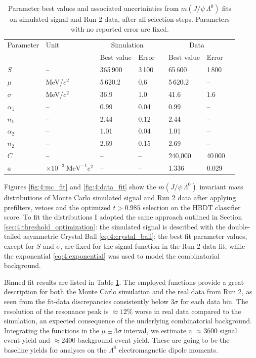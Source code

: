 \begin{table}
	\begin{center}
	\begin{tabular}{@{}llllllll@{}}
		\toprule
		Parameter
		& Unit
		& \multicolumn{2}{c}{Simulation}	& \phantom{a}
		& \multicolumn{2}{c}{Data} \\
		\cmidrule{3-4} \cmidrule{6-7}
		&& Best value	& Error				&& Best value	& Error \\
		\midrule
		$S$			& --		& 365\,900	& 3\,100&& 65\,600	& 1\,800	\\
		$\mu$		& MeV/$c^2$	& 5\,620.2 	& 0.6	&& 5\,620.2	& -- 		\\
		$\sigma$	& MeV/$c^2$	& 36.9		& 1.0	&& 41.6		& 1.6		\\
		$\alpha_1$	& --		& 0.99		& 0.04	&& 0.99	& --		\\
		$n_1$		& --		& 2.44		& 0.12	&& 2.44		& --		\\
		$\alpha_2$	& --		& 1.01		& 0.04	&& 1.01	& --		\\
		$n_2$		& --		& 2.69		& 0.15	&& 2.69		& --		\\
		$C$			& --		& --		& --	&& 240,000	& 40\,000	\\
		$a$			& $\times {10}^{-3}~\text{MeV}^{-1}c^2$
								& --		& --	&& 1.336	& 0.029		\\
		\bottomrule
	\end{tabular}
	\end{center}
	\caption{Parameter best values and associated uncertainties from $m(J/\psi\,\Lambda^0)$ fits on simulated signal and Run 2 data, after all selection steps. Parameters with no reported error are fixed.}
	\label{tab:4:fit_results}
\end{table}

Figures \ref{fig:4:mc_fit} and \ref{fig:4:data_fit} show the $m(J/\psi\,\Lambda^0)$ invariant mass distributions of Monte Carlo simulated signal and Run 2 data after applying prefilters, \physbkgshort vetoes and the optimized $t > 0.985$ selection on the HBDT classifier score.
To fit the distributions I adopted the same approach outlined in Section \ref{sec:4:threshold_optimization}:
the simulated signal is described with the double-tailed asymmetric Crystal Ball \eqref{eq:4:crystal_ball};
the best fit parameter values, except for $S$ and $\sigma$, are fixed for the signal function in the Run 2 data fit, while the exponential \eqref{eq:4:exponential} was used to model the combinatorial background.

Binned fit results are listed in Table \ref{tab:4:fit_results}.
The employed functions provide a great description for both the Monte Carlo simulation and the real data from Run 2, as seen from the fit-data discrepancies consistently below $3\sigma$ for each data bin.
The resolution of the resonance peak is $\approx 12\%$ worse in real data compared to the simulation, an expected consequence of the underlying combinatorial background.
Integrating the functions in the $\mu \pm 3\sigma$ interval, we estimate a $\approx 3600$ signal event yield and $\approx 2400$ background event yield.
These are going to be the baseline yields for analyses on the $\Lambda^0$ electromagnetic dipole moments.